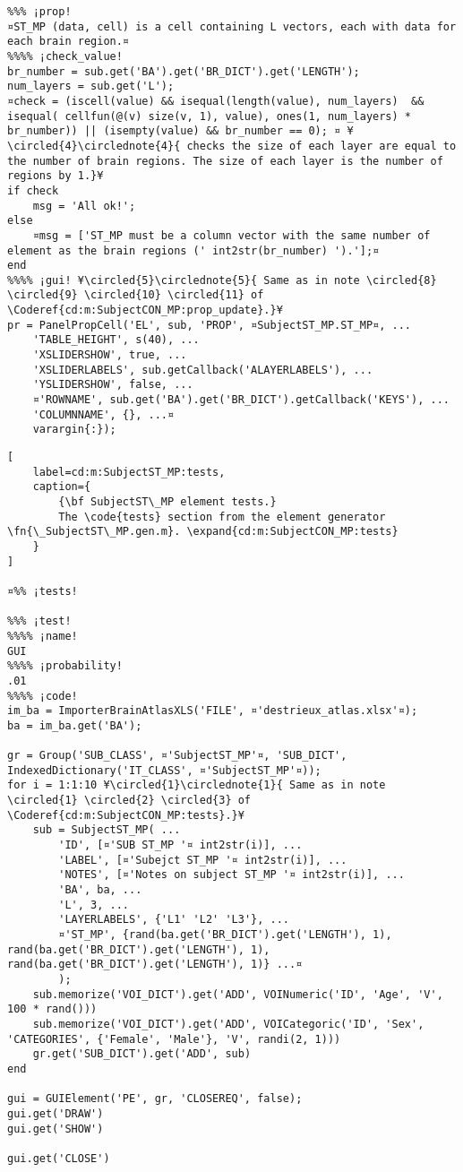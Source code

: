 \documentclass{tufte-handout}
\begin{document}
\begin{lstlisting}
%%% ¡prop!
¤ST_MP (data, cell) is a cell containing L vectors, each with data for each brain region.¤
%%%% ¡check_value!
br_number = sub.get('BA').get('BR_DICT').get('LENGTH');
num_layers = sub.get('L');
¤check = (iscell(value) && isequal(length(value), num_layers)  && isequal( cellfun(@(v) size(v, 1), value), ones(1, num_layers) * br_number)) || (isempty(value) && br_number == 0); ¤ ¥\circled{4}\circlednote{4}{ checks the size of each layer are equal to the number of brain regions. The size of each layer is the number of regions by 1.}¥
if check
    msg = 'All ok!';
else   
    ¤msg = ['ST_MP must be a column vector with the same number of element as the brain regions (' int2str(br_number) ').'];¤
end
%%%% ¡gui! ¥\circled{5}\circlednote{5}{ Same as in note \circled{8} \circled{9} \circled{10} \circled{11} of \Coderef{cd:m:SubjectCON_MP:prop_update}.}¥
pr = PanelPropCell('EL', sub, 'PROP', ¤SubjectST_MP.ST_MP¤, ...
    'TABLE_HEIGHT', s(40), ...
    'XSLIDERSHOW', true, ...
    'XSLIDERLABELS', sub.getCallback('ALAYERLABELS'), ...
    'YSLIDERSHOW', false, ...
    ¤'ROWNAME', sub.get('BA').get('BR_DICT').getCallback('KEYS'), ...
    'COLUMNNAME', {}, ...¤
    varargin{:});

\end{lstlisting}

\begin{lstlisting}[
	label=cd:m:SubjectST_MP:tests,
	caption={
		{\bf SubjectST\_MP element tests.}
		The \code{tests} section from the element generator \fn{\_SubjectST\_MP.gen.m}. \expand{cd:m:SubjectCON_MP:tests}
	}
]

¤%% ¡tests!

%%% ¡test!
%%%% ¡name!
GUI
%%%% ¡probability!
.01
%%%% ¡code!
im_ba = ImporterBrainAtlasXLS('FILE', ¤'destrieux_atlas.xlsx'¤);
ba = im_ba.get('BA');

gr = Group('SUB_CLASS', ¤'SubjectST_MP'¤, 'SUB_DICT', IndexedDictionary('IT_CLASS', ¤'SubjectST_MP'¤));
for i = 1:1:10 ¥\circled{1}\circlednote{1}{ Same as in note \circled{1} \circled{2} \circled{3} of \Coderef{cd:m:SubjectCON_MP:tests}.}¥
    sub = SubjectST_MP( ...
        'ID', [¤'SUB ST_MP '¤ int2str(i)], ...
        'LABEL', [¤'Subejct ST_MP '¤ int2str(i)], ...
        'NOTES', [¤'Notes on subject ST_MP '¤ int2str(i)], ...
        'BA', ba, ...
        'L', 3, ...
        'LAYERLABELS', {'L1' 'L2' 'L3'}, ...
        ¤'ST_MP', {rand(ba.get('BR_DICT').get('LENGTH'), 1), rand(ba.get('BR_DICT').get('LENGTH'), 1), rand(ba.get('BR_DICT').get('LENGTH'), 1)} ...¤
        );
    sub.memorize('VOI_DICT').get('ADD', VOINumeric('ID', 'Age', 'V', 100 * rand()))
    sub.memorize('VOI_DICT').get('ADD', VOICategoric('ID', 'Sex', 'CATEGORIES', {'Female', 'Male'}, 'V', randi(2, 1)))
    gr.get('SUB_DICT').get('ADD', sub)
end

gui = GUIElement('PE', gr, 'CLOSEREQ', false);
gui.get('DRAW')
gui.get('SHOW')

gui.get('CLOSE')
\end{lstlisting}
\end{document}
